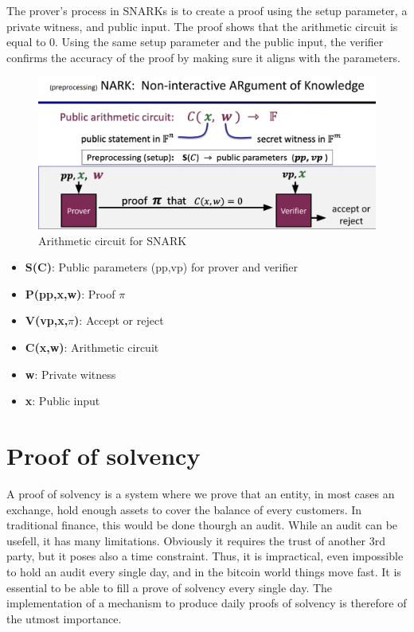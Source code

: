 The prover's process in SNARKs is to create a proof using the setup parameter, a private witness, and public input. The proof shows that the arithmetic circuit is equal to 0. 
Using the same setup parameter and the public input, the verifier confirms the accuracy of the proof by making sure it aligns with the parameters.

\begin{figure}[H]
    \centering
    \includegraphics[width=130mm]{Circuit.png}
    \caption{Arithmetic circuit for SNARK \cite{ZKM2}}
    \label{overflow}
    \end{figure}

\begin{itemize}

    \item \textbf{S(C)}: Public parameters (pp,vp) for prover and verifier
    
    \item \textbf{P(pp,x,w)}: Proof $\pi$

    \item \textbf{V(vp,x,$\pi$)}: Accept or reject

    \item \textbf{C(x,w)}: Arithmetic circuit

    \item \textbf{w}: Private witness

    \item \textbf{x}: Public input
    
    \end{itemize}




\section{Proof of solvency}

A proof of solvency is a system where we prove that an entity, in most cases an exchange, hold enough assets to cover
the balance of every customers. In traditional finance, this would be done thourgh an audit. While an audit can be usefell,
it has many limitations. Obviously it requires the trust of another 3rd party, but it poses also a time constraint. Thus, it is impractical, even impossible
to hold an audit every single day, and in the bitcoin world things move fast. It is essential to be able to fill a prove of solvency every single day.
The implementation of a mechanism to produce daily proofs of solvency is therefore of the utmost importance.

